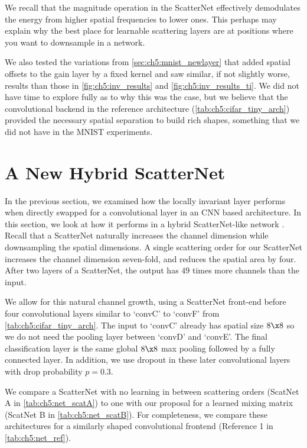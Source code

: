 We recall that the magnitude operation in the ScatterNet effectively
demodulates the energy from higher spatial frequencies to lower ones. This
perhaps may explain why the best place for learnable scattering layers
are at positions where you want to downsample in a network.
% 

We also tested the variations from \autoref{sec:ch5:mnist_newlayer} that added
spatial offsets to the gain layer by a fixed kernel and saw similar, if not
slightly worse, results than those in \autoref{fig:ch5:inv_results} and
\autoref{fig:ch5:inv_results_ti}. We did not
have time to explore fully as to why this was the case, but we believe that the
convolutional backend in the reference architecture (\autoref{tab:ch5:cifar_tiny_arch})
provided the necessary spatial separation to build rich shapes, something that
we did not have in the MNIST experiments.

\section{A New Hybrid ScatterNet}\label{sec:ch5:scat_exp}


In the previous section, we examined how the locally invariant layer performs when
directly swapped for a convolutional layer in an CNN based architecture.
In this section, we look at how it performs in a hybrid ScatterNet-like network
\cite{oyallon_hybrid_2017,oyallon_scaling_2017}. Recall that a ScatterNet
naturally increases the channel dimension while downsampling the spatial
dimensions. A single scattering order for our ScatterNet increases the channel dimension 
seven-fold, and reduces the spatial area by four. After two layers of a
ScatterNet, the output has $49$ times more channels than the input.

We allow for this natural channel growth, using a ScatterNet front-end before
four convolutional layers similar to `convC' to `convF' from
\autoref{tab:ch5:cifar_tiny_arch}. The input to `convC' already has spatial size
$8\x 8$ so we do not need the pooling layer between `convD' and `convE'. The
final classification layer is the same global $8\x 8$ max pooling followed by a
fully connected layer. In addition, we use dropout in these later convolutional
layers with drop probability $p=0.3$.

We compare a ScatterNet with no learning in between scattering orders (ScatNet A
in \autoref{tab:ch5:net_scatA}) to one with our proposal for a learned mixing
matrix (ScatNet B in \autoref{tab:ch5:net_scatB}). For completeness, we
compare these architectures for a similarly shaped convolutional frontend
(Reference 1 in \autoref{tab:ch5:net_ref}).

